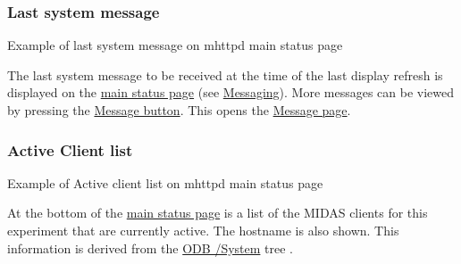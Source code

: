 \par


\par
 \label{RC_mhttpd_status_page_features_idx_message_last}
\hypertarget{RC_mhttpd_status_page_features_idx_message_last}{}
 \hypertarget{RC_mhttpd_status_page_features_RC_mhttpd_status_latest_msg}{}\subsubsection{Last system message}\label{RC_mhttpd_status_page_features_RC_mhttpd_status_latest_msg}
\begin{center} Example of last system message on mhttpd main status page \par
\par
\par
  \end{center}  \par


The last system message to be received at the time of the last display refresh is displayed on the \hyperlink{RC_mhttpd_Main_Status_page_RC_mhttpd_main_status}{main status page} (see \hyperlink{F_Messaging}{Messaging}). More messages can be viewed by pressing the \hyperlink{RC_mhttpd_status_page_features_RC_mhttpd_status_Page_buttons}{Message button}. This opens the \hyperlink{RC_mhttpd_Message_page}{Message page}.

\par


\par


\label{RC_mhttpd_status_page_features_idx_clients_active_mhttpd}
\hypertarget{RC_mhttpd_status_page_features_idx_clients_active_mhttpd}{}
 \hypertarget{RC_mhttpd_status_page_features_RC_mhttpd_status_clients}{}\subsubsection{Active Client list}\label{RC_mhttpd_status_page_features_RC_mhttpd_status_clients}
\begin{center} Example of Active client list on mhttpd main status page \par
\par
\par
  \end{center}  \par


At the bottom of the \hyperlink{RC_mhttpd_Main_Status_page_RC_mhttpd_main_status}{main status page} is a list of the MIDAS clients for this experiment that are currently active. The hostname is also shown. This information is derived from the \hyperlink{RC_Run_States_and_Transitions_RC_odb_system_tree}{ODB /System} tree .

